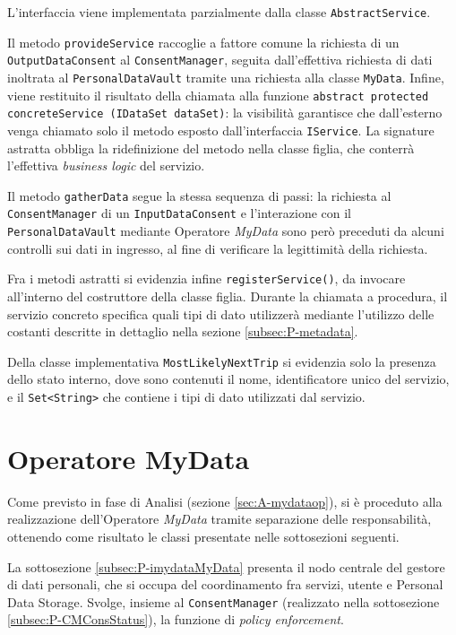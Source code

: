 L’interfaccia viene implementata parzialmente dalla classe \texttt{AbstractService}. 

Il metodo \texttt{provideService} raccoglie a fattore comune la richiesta di un \texttt{OutputDataConsent} al \texttt{ConsentManager}, seguita dall’effettiva richiesta di dati inoltrata al \texttt{PersonalDataVault} tramite una richiesta alla classe \texttt{MyData}. Infine, viene restituito il risultato della chiamata alla funzione \texttt{abstract protected concreteService (IDataSet dataSet)}: la visibilit\`a garantisce che dall’esterno venga chiamato solo il metodo esposto dall’interfaccia \texttt{IService}. La signature astratta obbliga la ridefinizione del metodo nella classe figlia, che conterr\`a l'effettiva \textit{business logic} del servizio.

Il metodo \texttt{gatherData} segue la stessa sequenza di passi: la richiesta al \texttt{ConsentManager} di un \texttt{InputDataConsent} e l’interazione con il \texttt{PersonalDataVault} mediante Operatore \textit{MyData} sono per\`o preceduti da alcuni controlli sui dati in ingresso, al fine di verificare la legittimit\`a della richiesta.

Fra i metodi astratti si evidenzia infine \texttt{registerService()}, da invocare all’interno del costruttore della classe figlia. Durante la chiamata a procedura, il servizio concreto specifica quali tipi di dato utilizzer\`a mediante l’utilizzo delle costanti descritte in dettaglio nella sezione \ref{subsec:P-metadata}.

Della classe implementativa \texttt{MostLikelyNextTrip} si evidenzia solo la presenza dello stato interno, dove sono contenuti il nome, identificatore unico del servizio, e il \texttt{Set<String>} che contiene i tipi di dato utilizzati dal servizio.

\section{Operatore MyData}
Come previsto in fase di Analisi (sezione \ref{sec:A-mydataop}), si \`e proceduto alla realizzazione dell'Operatore \textit{MyData} tramite separazione delle responsabilit\`a, ottenendo come risultato le classi presentate nelle sottosezioni seguenti.

La sottosezione \ref{subsec:P-imydataMyData} presenta il nodo centrale del gestore di dati personali, che si occupa del coordinamento fra servizi, utente e Personal Data Storage. Svolge, insieme al \texttt{ConsentManager} (realizzato nella sottosezione \ref{subsec:P-CMConsStatus}), la funzione di \textit{policy enforcement}.


